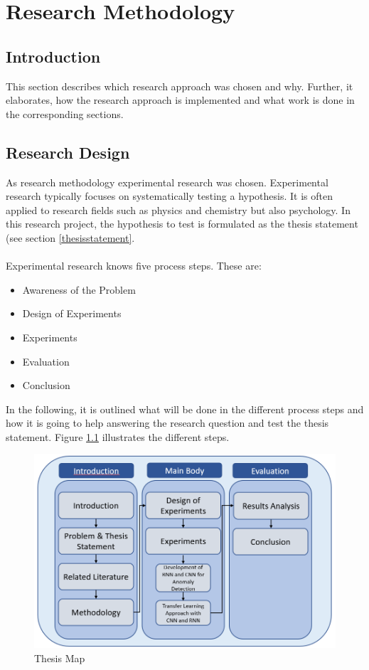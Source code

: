 
\chapter{Research Methodology} %

\section{Introduction}
This section describes which research approach was chosen and why. Further, it elaborates, how the research approach is implemented and what work is done in the corresponding sections. 

\section{Research Design}
As research methodology experimental research was chosen. Experimental research typically focuses on systematically testing a hypothesis. It is often applied to research fields such as physics and chemistry but also psychology. In this research project, the hypothesis to test is formulated as the thesis statement (see section \ref{thesisstatement}.\\
\\
Experimental research knows five process steps. These are:

\begin{itemize}
	\item Awareness of the Problem
	\item Design of Experiments
	\item Experiments
	\item Evaluation
	\item Conclusion
\end{itemize}

In the following, it is outlined what will be done in the different process steps and how it is going to help answering the research question and test the thesis statement. Figure \ref{Thesis Map} illustrates the different steps.

\begin{figure}[h]
	\centering
	\includegraphics[scale=0.5]{Figures/Thesis Map}
	\decoRule
	\caption[Thesis Map]{Thesis Map \parencite{own}}
	\label{Thesis Map}
\end{figure}

